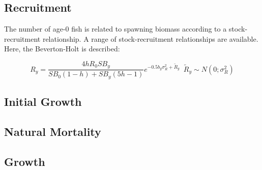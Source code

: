 \documentclass[11pt,
  english,
  letterpaper,
]{article}
\begin{document}

\hypertarget{recruitment}{%
\subsection{Recruitment}\label{recruitment}}

\leavevmode\tagmcend\tagstructend


The number of age-0 fish is related to spawning biomass according to a stock-recruitment relationship. A range of stock-recruitment relationships are available. Here, the Beverton-Holt is described:

\leavevmode\tagmcend\tagstructend\par


\begin{equation}
\label{eqn2}
R_y = \frac{4hR_0SB_y}{SB_0(1-h)+SB_y(5h-1)}e^{-0.5b_y\sigma_R^2+\tilde{R}_y} \;\ \tilde{R}_y \sim N(0; \sigma_R^2)
\end{equation}

\leavevmode\tagmcend\tagstructend\par


\hypertarget{initial-growth}{%
\subsection{Initial Growth}\label{initial-growth}}

\leavevmode\tagmcend\tagstructend


\hypertarget{natural-mortality}{%
\subsection{Natural Mortality}\label{natural-mortality}}

\leavevmode\tagmcend\tagstructend


\hypertarget{growth}{%
\subsection{Growth}\label{growth}}

\leavevmode\tagmcend\tagstructend
\end{document}
